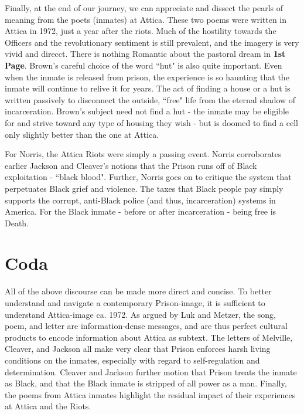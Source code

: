 \documentclass[14pt, letterpaper]{report}
\begin{document}
	Finally, at the end of our journey, we can appreciate and dissect 
	the pearls of meaning from the poets (inmates) at Attica. These two 
	poems were written in Attica in 1972, just a year after the riots. 
	Much of the hostility towards the Officers and the revolutionary 
	sentiment is still prevalent, and the imagery is very vivid and 
	direcct. There is nothing Romantic about the pastoral dream in 
	\textbf{1st Page}. Brown's careful choice of the word ``hut" is 
	also quite important. Even when the inmate is released from prison, 
	the experience is so haunting that the inmate will continue to relive 
	it for years. The act of finding a house or a hut is written passively 
	to disconnect the outside, ``free" life from the eternal shadow of 
	incarceration. Brown's subject need not find a hut - the inmate may 
	be eligible for and strive toward any type of housing they wish - but 
	is doomed to find a cell only slightly better than the one at Attica. 
	
	For Norris, the Attica Riots were simply a passing event. Norris 
	corroborates earlier Jackson and Cleaver's notions that the Prison 
	runs off of Black exploitation - ``black blood". Further, Norris goes 
	on to critique the system that perpetuates Black grief and violence.
	The taxes that Black people pay simply supports the corrupt, anti-Black 
	police (and thus, incarceration) systems in America. For the Black 
	inmate - before or after incarceration - being free is Death. 
	
	\section*{Coda}
	
	All of the above discourse can be made more direct and concise. To 
	better understand and navigate a contemporary Prison-image, it is 
	sufficient to understand Attica-image ca. 1972. As argued by Luk 
	and Metzer, the song, poem, and letter are information-dense messages, 
	and are thus perfect cultural products to encode information about 
	Attica as subtext. The letters of Melville, Cleaver, and Jackson all 
	make very clear that Prison enforces harsh living conditions on the 
	inmates, especially with regard to self-regulation and determination. 
	Cleaver and Jackson further motion that Prison treats the inmate as 
	Black, and that the Black inmate is stripped of all power as a man. 
	Finally, the poems from Attica inmates highlight the residual impact 
	of their experiences at Attica and the Riots. 
	
\end{document}
